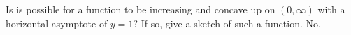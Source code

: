 {Is is possible for a function to be increasing and concave up on $(0,\infty)$ with a horizontal asymptote of $y=1$? If so, give a sketch of such a function.
}
{No.
}

